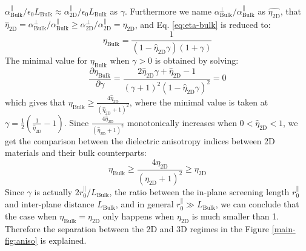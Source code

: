 \documentclass[manuscript=suppinfo,email=true,hyperref=true,keywords=false]{achemso}
\begin{document}
$\alpha_{\mathrm{Bulk}}^{\parallel} /\epsilon_{0}L_{\mathrm{Bulk}}
\approx \alpha_{\mathrm{2D}}^{\parallel}/
\epsilon_{0}L_{\mathrm{Bulk}}$ as $\gamma$. Furthermore we name
$\alpha_{\mathrm{Bulk}}^{\perp}/\alpha_{\mathrm{Bulk}}^{\parallel}$ as
$\hat{\eta_{\mathrm{2D}}}$, that
$\hat{\eta}_{\mathrm{2D}} =
\alpha_{\mathrm{Bulk}}^{\perp}/\alpha_{\mathrm{Bulk}}^{\parallel} \geq
\alpha_{\mathrm{2D}}^{\perp}/\alpha_{\mathrm{2D}}^{\parallel}=\eta_{\mathrm{2D}}$,
and Eq. \ref{eq:eta-bulk} is reduced to:
\begin{equation}
  \label{eq:eta-bulk-2}
  \eta_{\mathrm{Bulk}} = \frac{1}{(1 - \hat{\eta}_{\mathrm{2D}} \gamma) (1 + \gamma)}
\end{equation}
The minimal value for $\eta_{\mathrm{Bulk}}$ when $\gamma>0$ is obtained by solving:
\begin{equation}
  \label{eq:eta-bulk-min}
  \frac{\partial \eta_{\mathrm{Bulk}}}{\partial \gamma}
  = \frac{2 \hat{\eta}_{\mathrm{2D}} \gamma + \hat{\eta}_{\mathrm{2D}} - 1}
  {(\gamma+1)^{2}(1 - \hat{\eta}_{\mathrm{2D}} \gamma)^{2}} = 0
\end{equation}
which gives that
$\eta_{\mathrm{Bulk}} \geq \frac{4
  \hat{\eta}_{\mathrm{2D}}}{(\hat{\eta}_{\mathrm{2D}} + 1)^{2}}$,
where the minimal value is taken at
$\gamma = \frac{1}{2}(\frac{1}{\hat{\eta}_{\mathrm{2D}}} - 1)$. Since
$\frac{4 \hat{\eta}_{\mathrm{2D}}}{(\hat{\eta}_{\mathrm{2D}} +
  1)^{2}}$ monotonically increases when
$0 < \hat{\eta}_{\mathrm{2D}} < 1$, we get the comparison between the
dielectric anisotropy indices between 2D materials and their bulk
counterparts:
\begin{equation}
  \label{eq:aniso-final}
\eta_{\mathrm{Bulk}} \geq \frac{4
  \eta_{\mathrm{2D}}}{(\eta_{\mathrm{2D}} + 1)^{2}} \geq
\eta_{\mathrm{2D}} 
\end{equation}
Since $\gamma$ is actually $2r_{0}^{\parallel}/L_{\mathrm{Bulk}}$, the
ratio between the in-plane screening length $r_{0}^{\parallel}$ and
inter-plane distance $L_{\mathrm{Bulk}}$, and in general
$r_{0}^{\parallel} \gg L_{\mathrm{Bulk}}$, we can conclude that the
case when $\eta_{\mathrm{Bulk}} = \eta_{\mathrm{2D}}$ only happens
when $\eta_{\mathrm{2D}}$ is much smaller than 1. Therefore the
separation between the 2D and 3D regimes in the Figure
\ref{main-fig:aniso} is explained.
\end{document}
